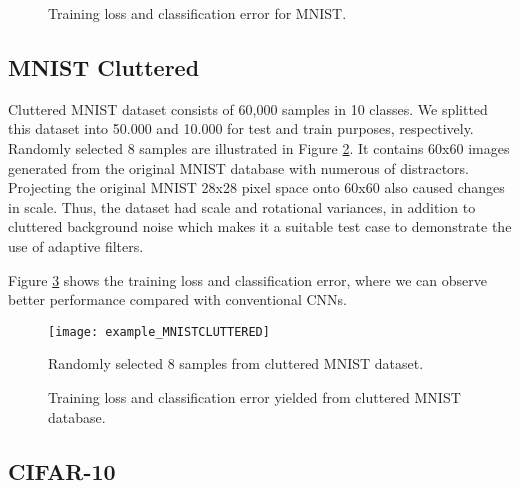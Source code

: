 \documentclass{bmvc2k}
\begin{document}
\begin{figure}
	\centering 
	\caption{Training loss and classification error for MNIST.}
	\label{fig:mnistplot}
\end{figure}


\subsection{MNIST Cluttered}
\label{mnistclut}
Cluttered MNIST dataset \cite{mnistcluttered} consists of 60,000 samples in 10 classes. We splitted this dataset into 50.000 and 10.000 for test and train purposes, respectively. Randomly selected 8 samples are illustrated in Figure \ref{fig:abc}. It contains 60x60 images generated from the original MNIST database with numerous of distractors. Projecting the original MNIST 28x28 pixel space onto 60x60 also caused changes in scale. Thus, the dataset had scale and rotational variances, in addition to cluttered background noise which makes it a suitable test case to demonstrate the use of adaptive filters.

Figure \ref{fig:mnistclutteredplot} shows the training loss and classification error, where we can observe better performance compared with conventional CNNs.

\begin{figure}
	\centering
	\texttt{[image: example\_MNISTCLUTTERED]}
	\caption{Randomly selected 8 samples from cluttered MNIST dataset.}
	\label{fig:abc}
\end{figure}

\begin{figure}
	\centering     %
	\caption{Training loss and classification error yielded from cluttered MNIST database.}
	\label{fig:mnistclutteredplot}
\end{figure}

\subsection{CIFAR-10}
\end{document}
